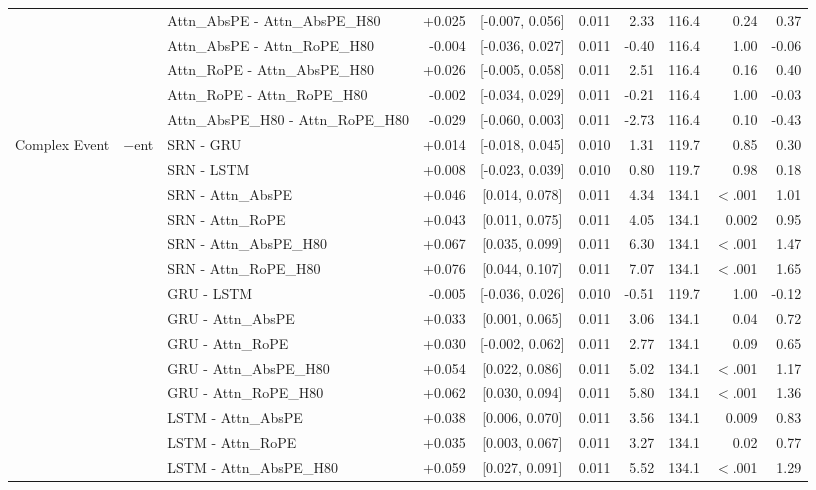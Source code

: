 \begin{longtable}{@{}lllrcrrrrr@{}}
 &  & Attn\_AbsPE - Attn\_AbsPE\_H80 & +0.025 & [-0.007, 0.056] & 0.011 & 2.33 & 116.4 & 0.24 & 0.37 \\
 &  & Attn\_AbsPE - Attn\_RoPE\_H80 & -0.004 & [-0.036, 0.027] & 0.011 & -0.40 & 116.4 & 1.00 & -0.06 \\
 &  & Attn\_RoPE - Attn\_AbsPE\_H80 & +0.026 & [-0.005, 0.058] & 0.011 & 2.51 & 116.4 & 0.16 & 0.40 \\
 &  & Attn\_RoPE - Attn\_RoPE\_H80 & -0.002 & [-0.034, 0.029] & 0.011 & -0.21 & 116.4 & 1.00 & -0.03 \\
 &  & Attn\_AbsPE\_H80 - Attn\_RoPE\_H80 & -0.029 & [-0.060, 0.003] & 0.011 & -2.73 & 116.4 & 0.10 & -0.43 \\
\addlinespace[2pt]
\addlinespace
Complex Event & $-$ent & SRN - GRU & +0.014 & [-0.018, 0.045] & 0.010 & 1.31 & 119.7 & 0.85 & 0.30 \\
 &  & SRN - LSTM & +0.008 & [-0.023, 0.039] & 0.010 & 0.80 & 119.7 & 0.98 & 0.18 \\
 &  & SRN - Attn\_AbsPE & +0.046 & [0.014, 0.078] & 0.011 & 4.34 & 134.1 & $<$.001 & 1.01 \\
 &  & SRN - Attn\_RoPE & +0.043 & [0.011, 0.075] & 0.011 & 4.05 & 134.1 & 0.002 & 0.95 \\
 &  & SRN - Attn\_AbsPE\_H80 & +0.067 & [0.035, 0.099] & 0.011 & 6.30 & 134.1 & $<$.001 & 1.47 \\
 &  & SRN - Attn\_RoPE\_H80 & +0.076 & [0.044, 0.107] & 0.011 & 7.07 & 134.1 & $<$.001 & 1.65 \\
 &  & GRU - LSTM & -0.005 & [-0.036, 0.026] & 0.010 & -0.51 & 119.7 & 1.00 & -0.12 \\
 &  & GRU - Attn\_AbsPE & +0.033 & [0.001, 0.065] & 0.011 & 3.06 & 134.1 & 0.04 & 0.72 \\
 &  & GRU - Attn\_RoPE & +0.030 & [-0.002, 0.062] & 0.011 & 2.77 & 134.1 & 0.09 & 0.65 \\
 &  & GRU - Attn\_AbsPE\_H80 & +0.054 & [0.022, 0.086] & 0.011 & 5.02 & 134.1 & $<$.001 & 1.17 \\
 &  & GRU - Attn\_RoPE\_H80 & +0.062 & [0.030, 0.094] & 0.011 & 5.80 & 134.1 & $<$.001 & 1.36 \\
 &  & LSTM - Attn\_AbsPE & +0.038 & [0.006, 0.070] & 0.011 & 3.56 & 134.1 & 0.009 & 0.83 \\
 &  & LSTM - Attn\_RoPE & +0.035 & [0.003, 0.067] & 0.011 & 3.27 & 134.1 & 0.02 & 0.77 \\
 &  & LSTM - Attn\_AbsPE\_H80 & +0.059 & [0.027, 0.091] & 0.011 & 5.52 & 134.1 & $<$.001 & 1.29 \\

\end{longtable}
